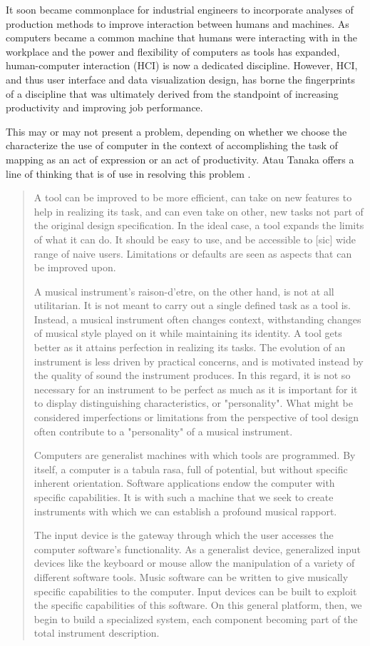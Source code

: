 It soon became commonplace for industrial engineers to incorporate analyses of production methods to improve interaction between humans and machines. As computers became a common machine that humans were interacting with in the workplace and the power and flexibility of computers as tools has expanded, human-computer interaction (HCI) is now a dedicated discipline. However, HCI, and thus user interface and data visualization design, has borne the fingerprints of a discipline that was ultimately derived from the standpoint of increasing productivity and improving job performance.

This may or may not present a problem, depending on whether we choose the characterize the use of computer in the context of accomplishing the task of mapping as an act of expression or an act of productivity. Atau Tanaka offers a line of thinking that is of use in resolving this problem \cite{tanaka2000}.

\begin{quote}
A tool can be improved to be more efficient, can take on new features to help in realizing its task, and can even take on other, new tasks not part of the original design specification. In the ideal case, a tool expands the limits of what it can do. It should be easy to use, and be accessible to [sic] wide range of naive users. Limitations or defaults are seen as aspects that can be improved upon.

A musical instrument's raison-d'etre, on the other hand, is not at all utilitarian. It is not meant to carry out a single defined task as a tool is. Instead, a musical instrument often changes context, withstanding changes of musical style played on it while maintaining its identity. A tool gets better as it attains perfection in realizing its tasks. The evolution of an instrument is less driven by practical concerns, and is motivated instead by the quality of sound the instrument produces. In this regard, it is not so necessary for an instrument to be perfect as much as it is important for it to display distinguishing characteristics, or "personality". What might be considered imperfections or limitations from the perspective of tool design often contribute to a "personality" of a musical instrument.

Computers are generalist machines with which tools are programmed. By itself, a computer is a tabula rasa, full of potential, but without specific inherent orientation. Software applications endow the computer with specific capabilities. It is with such a machine that we seek to create instruments with which we can establish a profound musical rapport.

The input device is the gateway through which the user accesses the computer software's functionality. As a generalist device, generalized input devices like the keyboard or mouse allow the manipulation of a variety of different software tools. Music software can be written to give musically specific capabilities to the computer. Input devices can be built to exploit the specific capabilities of this software. On this general platform, then, we begin to build a specialized system, each component becoming part of the total instrument description.
\end{quote}

